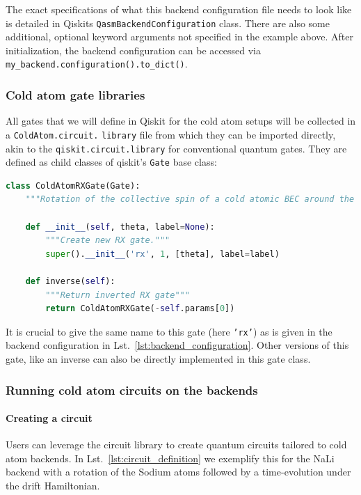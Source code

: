 \documentclass[a4paper, 10pt]{article}
\newcommand{\co}[1]{\texttt{#1}}
\begin{document}
The exact specifications of what this backend configuration file needs to look like is detailed in Qiskits \co{QasmBackendConfiguration} class. There are also some additional, optional keyword arguments not specified in the example above. After initialization, the backend configuration can be accessed via \co{my\_backend.configuration().to\_dict()}. 

\subsubsection{Cold atom gate libraries}

All gates that we will define in Qiskit for the cold atom setups will be collected in a \co{ColdAtom.circuit.} \co{library} file from which they can be imported directly, akin to the \co{qiskit.circuit.library} for conventional quantum gates. 
They are defined as child classes of qiskit's \co{Gate} base class:

\begin{lstlisting}[language=Python, caption = definition of a cold atom gate in qiskit, label={lst:gate_definition}]
class ColdAtomRXGate(Gate):
    """Rotation of the collective spin of a cold atomic BEC around the x-axis"""

    def __init__(self, theta, label=None):
        """Create new RX gate."""
        super().__init__('rx', 1, [theta], label=label)

    def inverse(self):
        """Return inverted RX gate"""
        return ColdAtomRXGate(-self.params[0])
\end{lstlisting}

It is crucial to give the same name to this gate (here \co{'rx'}) as is given in the backend configuration in Lst.~\ref{lst:backend_configuration}. Other versions of this gate, like an inverse can also be directly implemented in this gate class. 

\subsubsection{Running cold atom circuits on the backends}

\paragraph{Creating a circuit} Users can leverage the circuit library to create quantum circuits tailored to cold atom backends.
In Lst.~\ref{lst:circuit_definition} we exemplify this for the NaLi backend with a rotation of the Sodium atoms followed by a time-evolution under the drift Hamiltonian.
\end{document}
